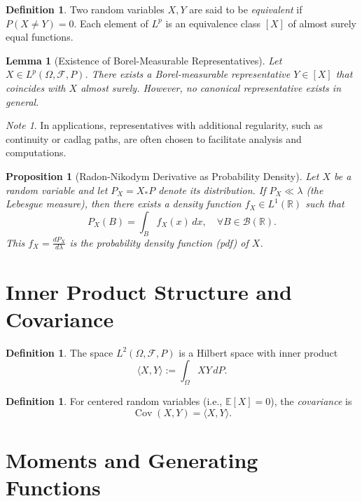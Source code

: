 \documentclass[11pt]{amsart}
\newtheorem{lemma}[theorem]{Lemma}
\newtheorem{proposition}[theorem]{Proposition}
\theoremstyle{definition}
\newtheorem{definition}[theorem]{Definition}
\theoremstyle{remark}
\newtheorem*{note}{Note}
\begin{document}
\begin{definition}
	Two random variables $X, Y$ are said to be \emph{equivalent} if $P(X \neq Y)=0$. Each element of $L^p$ is an equivalence class $[X]$ of almost surely equal functions.
\end{definition}

\begin{lemma}[Existence of Borel-Measurable Representatives]
	Let $X \in L^p(\Omega, \mathcal{F}, P)$. There exists a Borel-measurable representative $Y \in [X]$ that coincides with $X$ almost surely. However, no canonical representative exists in general.
\end{lemma}

\begin{note}
	In applications, representatives with additional regularity, such as continuity or cadlag paths, are often chosen to facilitate analysis and computations.
\end{note}

\begin{proposition}[Radon-Nikodym Derivative as Probability Density]
	Let $X$ be a random variable and let $P_X = X_*P$ denote its distribution. If $P_X \ll \lambda$ (the Lebesgue measure), then there exists a density function $f_X \in L^1(\mathbb{R})$ such that
	\[
		P_X(B) = \int_B f_X(x) \, dx, \quad \forall B \in \mathcal{B}(\mathbb{R}).
	\]
	This $f_X = \frac{dP_X}{d\lambda}$ is the \emph{probability density function} (pdf) of $X$.
\end{proposition}

\section{Inner Product Structure and Covariance}

\begin{definition}
	The space $L^2(\Omega, \mathcal{F}, P)$ is a Hilbert space with inner product
	\[
		\langle X, Y \rangle := \int_\Omega X Y \, dP.
	\]
\end{definition}

\begin{definition}
	For centered random variables (i.e., $\mathbb{E}[X]=0$), the \emph{covariance} is
	\[
		\operatorname{Cov}(X, Y) = \langle X, Y \rangle.
	\]
\end{definition}

\section{Moments and Generating Functions}
\end{document}
